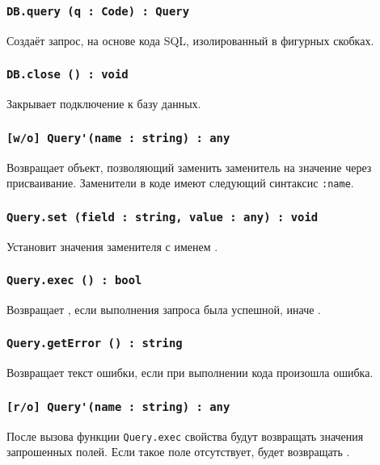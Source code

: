 \subsubsection{\lstinline|DB.query (q : Code) : Query|}

Создаёт запрос, на основе кода SQL, изолированный в фигурных скобках.

\subsubsection{\lstinline|DB.close () : void|}

Закрывает подключение к базу данных.

\subsubsection{\lstinline|[w/o] Query'(name : string) : any|}

Возвращает объект, позволяющий заменить заменитель на значение через присваивание. Заменители в коде имеют следующий синтаксис \lstinline|:name|.

\subsubsection{\lstinline|Query.set (field : string, value : any) : void|}

Установит значения заменителя с именем .

\subsubsection{\lstinline|Query.exec () : bool|}

Возвращает \true, если выполнения запроса была успешной, иначе \false.

\subsubsection{\lstinline|Query.getError () : string|}

Возвращает текст ошибки, если при выполнении кода произошла ошибка.

\subsubsection{\lstinline|[r/o] Query'(name : string) : any|}

После вызова функции \lstinline|Query.exec| свойства будут возвращать значения запрошенных полей. Если такое поле отсутствует, будет возвращать \void.

